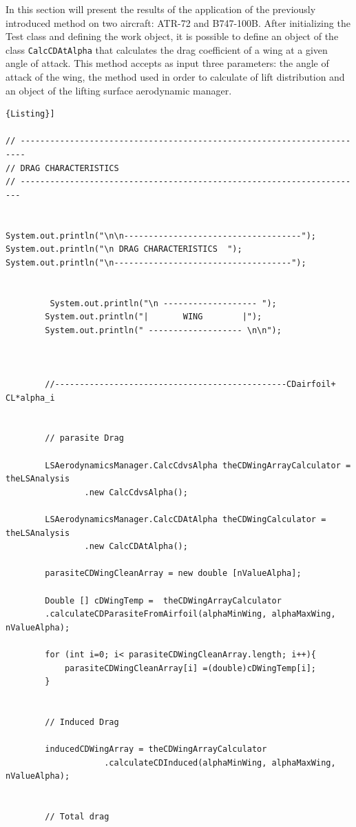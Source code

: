 In this section will present the results of the application of the previously introduced method on two aircraft: ATR-72 and B747-100B.
After initializing the Test class and defining the work object, it is possible to define an object of the class \texttt{CalcCDAtAlpha} that calculates the drag coefficient of a wing at a given angle of attack. This method accepts as input three parameters: the angle of attack of the wing,  the method used in order to calculate of lift distribution and an object of the lifting surface aerodynamic manager.
\noindent \\
\begin{lstlisting}[frame=rbl,caption={{\footnotesize Use of Drag Calculator class}},label= [style=\bfseries]{Listing}]

// -----------------------------------------------------------------------
// DRAG CHARACTERISTICS 
// ----------------------------------------------------------------------


System.out.println("\n\n------------------------------------");
System.out.println("\n DRAG CHARACTERISTICS  ");
System.out.println("\n------------------------------------");


         System.out.println("\n ------------------- ");
		System.out.println("|       WING        |");
		System.out.println(" ------------------- \n\n");



		//-----------------------------------------------CDairfoil+ CL*alpha_i


		// parasite Drag

		LSAerodynamicsManager.CalcCdvsAlpha theCDWingArrayCalculator = theLSAnalysis
				.new CalcCdvsAlpha();

		LSAerodynamicsManager.CalcCDAtAlpha theCDWingCalculator = theLSAnalysis
				.new CalcCDAtAlpha();

		parasiteCDWingCleanArray = new double [nValueAlpha];

		Double [] cDWingTemp =  theCDWingArrayCalculator
		.calculateCDParasiteFromAirfoil(alphaMinWing, alphaMaxWing, nValueAlpha);
		
		for (int i=0; i< parasiteCDWingCleanArray.length; i++){
			parasiteCDWingCleanArray[i] =(double)cDWingTemp[i];
		}


		// Induced Drag 

		inducedCDWingArray = theCDWingArrayCalculator
		            .calculateCDInduced(alphaMinWing, alphaMaxWing, nValueAlpha);


		// Total drag


\end{lstlisting}
